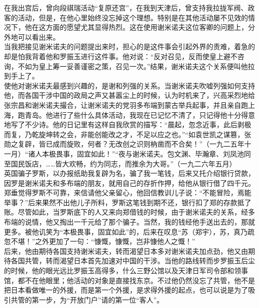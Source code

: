 在我出宫后，曾向段祺瑞活动“复原还宫”，在我到天津后，曾支持我拉拢军阀、政客的活动，但是，在他心里始终没忘掉这个理想。特别是在其他活动屡不见效的情况下，他在这方面的愿望尤其显得热烈。这在使用谢米诺夫这位客卿的问题上，分外地可以看出来。\\

当我把接见谢米诺夫的问题提出来时，担心的是这件事会引起外界的责难，着急的却是怕我背着他和罗振玉进行这件事。他对说：“反对召见，反而使皇上避不咨询，不如为皇上筹一妥善谨密之策，召见一次。”结果，谢米诺夫这个关系便叫他拉到手上了。\\

使他对谢米诺夫最感到兴趣的，是谢和列强的关系。当谢米诺夫吹嘘列强如何支持他，而各国干涉中国的政局之声又甚嚣尘上的时候，认为时机来了，兴高采烈地给张宗昌和谢米诺夫撮合，让谢米诺夫的党羽多布端到蒙古举兵起事，并且亲自跑上海，跑青岛。他进行了些什么具体活动，我现在已记忆不清了，只记得他十分得意地写了不少诗。他的日记里有这样自我欣赏的描写：“晨起，忽念近事，此后剥极而复，乃乾旋坤转之会，非能创能改之才，不足以应之也。”“如袁世凯之谋篡，张勋之复辟，皆已成而旋败，何者？无改创之识则枘凿而不合矣！”（一九二五年十一月）“诸人本极畏事，固宜如此！”“夜与谢米诺夫。包文渊、毕瀚章、刘凤池同至国民饭店，……皆大欢畅，约为同志，而推余为大哥。”（一九二六年五月）\\

英国骗子罗斯，以办报纸助我复辟为名，骗了我一笔钱，后来又托介绍银行贷款，因罗是谢米诺夫和多布端的朋友，就用自己的存折作押，给他从银行借了四千元。郑垂觉得罗斯不可靠，来信请他父亲留心，他回信教训儿子说：“不能冒险，焉能举事？”后来果然不出他儿子所料，罗斯这笔钱到期不还，银行扣了郑的存款抵了账。尽管如此，当罗斯底下的人又来向郑借钱的时候，由于谢米诺夫的关系，经多布端的说情，他又掏出一千元给了那个骗子。当然，我的钱经他手送出去的，那就更多。被他讥笑为“本极畏事，固宜如此”的，后来在叹息“苏（郑宇），苏，真乃疏忽不堪！”之外更加了一句：“慷慨，慷慨，岂非慷他人之慨！”\\

后来，他由期待各国支持谢米诺夫，转而渴望日本多对谢米诺夫加点劲，他又由期待各国共管，转而渴望日本首先加速对中国的干涉。当他的路线转而步罗振玉后尘的时候，他的眼光远比罗振玉高得多，什么三野公馆以及天津日军司令部和领事馆，都不在他眼里；他活动的对象是直接找东京。不过他仍然没忘了共管，他不是把日本看做唯一的外援，而是第一个外援，是求得外援的起点，也可以说是为了吸引共管的第一步，为“开放门户”请的第一位“客人”。\\

